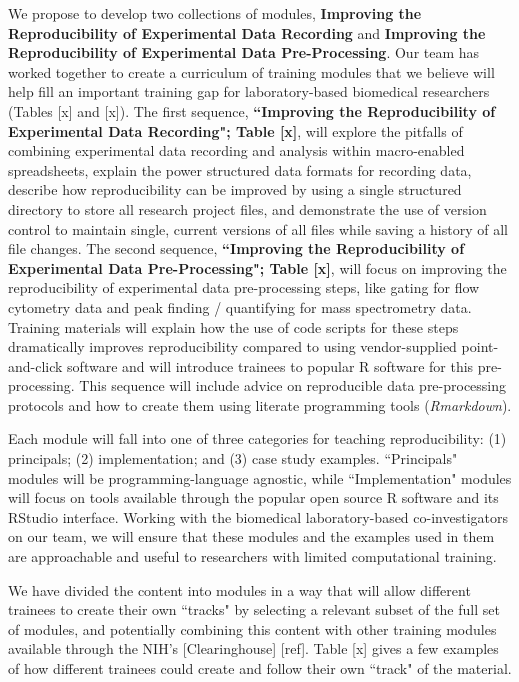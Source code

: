 \documentclass[pdftex,english,11pt,parskip=half]{scrartcl}
\begin{document}
We propose to develop two collections of modules, \textbf{Improving the Reproducibility of Experimental Data Recording} and \textbf{Improving the Reproducibility of Experimental Data Pre-Processing}. Our team has worked together to create a curriculum of training modules that we believe will help fill an important training gap for laboratory-based biomedical researchers (Tables [x] and [x]). The first sequence, \textbf{``Improving the Reproducibility of Experimental Data Recording"; Table [x]}, will explore the pitfalls of combining experimental data recording and analysis within macro-enabled spreadsheets, explain the power structured data formats for recording data, describe how reproducibility can be improved by using a single structured directory to store all research project files, and demonstrate the use of version control to maintain single, current versions of all files while saving a history of all file changes. The second sequence, \textbf{``Improving the Reproducibility of Experimental Data Pre-Processing"; Table [x]}, will focus on improving the reproducibility of experimental data pre-processing steps, like gating for flow cytometry data and peak finding / quantifying for mass spectrometry data. Training materials will explain how the use of code scripts for these steps dramatically improves reproducibility compared to using vendor-supplied point-and-click software and will introduce trainees to popular R software for this pre-processing. This sequence will include advice on reproducible data pre-processing protocols and how to create them using literate programming tools (\textit{Rmarkdown}).

Each module will fall into one of three categories for teaching reproducibility: (1) principals; (2) implementation; and (3) case study examples. ``Principals" modules will be programming-language agnostic, while ``Implementation" modules will focus on tools available through the popular open source R software and its RStudio interface. Working with the biomedical laboratory-based co-investigators on our team, we will ensure that these modules and the examples used in them are approachable and useful to researchers with limited computational training. 

We have divided the content into modules in a way that will allow different trainees to create their own ``tracks" by selecting a relevant subset of the full set of modules, and potentially combining this content with other training modules available through the NIH's [Clearinghouse] [ref]. Table [x] gives a few examples of how different trainees could create and follow their own ``track" of the material. 
\end{document}
